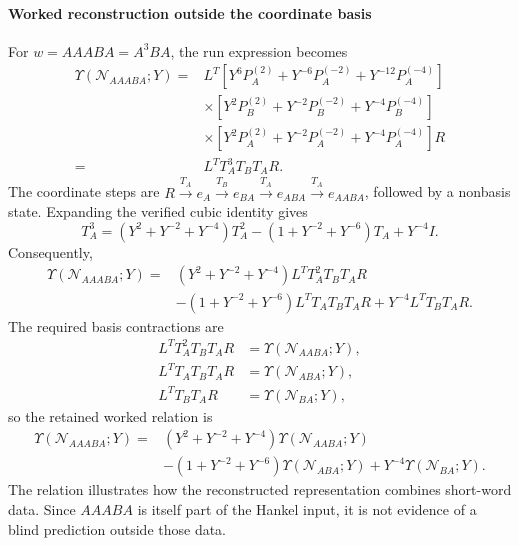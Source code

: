 \paragraph{Worked reconstruction outside the coordinate basis}
\label{supp:nonabelian_worked_example}
For $w=AAABA=A^3BA$, the run expression becomes
\begin{equation}
\begin{aligned}
\Upsilon(\mathcal N_{AAABA};Y)={}&L^T\left[Y^6P_A^{(2)}+Y^{-6}P_A^{(-2)}+Y^{-12}P_A^{(-4)}\right]\\
&\times\left[Y^2P_B^{(2)}+Y^{-2}P_B^{(-2)}+Y^{-4}P_B^{(-4)}\right]\\
&\times\left[Y^2P_A^{(2)}+Y^{-2}P_A^{(-2)}+Y^{-4}P_A^{(-4)}\right]R\\
={}&L^TT_A^3T_BT_AR.
\end{aligned}
\label{supp:deriv:eq:AAABA_projector_prediction}
\end{equation}
The coordinate steps are $R\xrightarrow{T_A}e_A\xrightarrow{T_B}e_{BA}\xrightarrow{T_A}e_{ABA}\xrightarrow{T_A}e_{AABA}$, followed by a nonbasis state. Expanding the verified cubic identity gives
\begin{equation}
T_A^3=(Y^2+Y^{-2}+Y^{-4})T_A^2-(1+Y^{-2}+Y^{-6})T_A+Y^{-4}I.
\label{supp:deriv:eq:TA3_reduction}
\end{equation}
Consequently,
\begin{equation}
\begin{aligned}
\Upsilon(\mathcal N_{AAABA};Y)={}&(Y^2+Y^{-2}+Y^{-4})L^TT_A^2T_BT_AR\\
&-(1+Y^{-2}+Y^{-6})L^TT_AT_BT_AR+Y^{-4}L^TT_BT_AR.
\end{aligned}
\label{supp:deriv:eq:AAABA_reduced}
\end{equation}
The required basis contractions are
\begin{equation}
\begin{aligned}
L^TT_A^2T_BT_AR&=\Upsilon(\mathcal N_{AABA};Y),\\
L^TT_AT_BT_AR&=\Upsilon(\mathcal N_{ABA};Y),\\
L^TT_BT_AR&=\Upsilon(\mathcal N_{BA};Y),
\end{aligned}
\label{supp:deriv:eq:AAABA_basis_contractions}
\end{equation}
so the retained worked relation is
\begin{equation}
\boxed{\begin{aligned}
\Upsilon(\mathcal N_{AAABA};Y)={}&(Y^2+Y^{-2}+Y^{-4})\Upsilon(\mathcal N_{AABA};Y)\\
&-(1+Y^{-2}+Y^{-6})\Upsilon(\mathcal N_{ABA};Y)+Y^{-4}\Upsilon(\mathcal N_{BA};Y).
\end{aligned}}
\label{supp:deriv:eq:AAABA_prediction}
\end{equation}
The relation illustrates how the reconstructed representation combines short-word data. Since $AAABA$ is itself part of the Hankel input, it is not evidence of a blind prediction outside those data.

